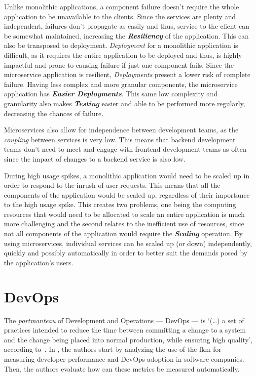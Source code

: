 Unlike monolithic applications, a component failure doesn't require the whole application to be unavailable to the clients. Since the services are plenty and independent, failures don't propagate as easily and thus, service to the client can be somewhat maintained, increasing the \textbf{\textit{Resiliency}} of the application. This can also be transposed to deployment. \textit{Deployment} for a monolithic application is difficult, as it requires the entire application to be deployed and thus, is highly impactful and prone to causing failure if just one component fails. Since the microservice application is resilient, \textit{Deployments} present a lower risk of complete failure. Having less complex and more granular components, the microservice application has \textbf{\textit{Easier Deployments}}. This same low complexity and granularity also makes \textbf{\textit{Testing}} easier and able to be performed more regularly, decreasing the chances of failure. 

Microservices also allow for independence between development teams, as the \textit{coupling} between services is very low. This means that backend development teams don't need to meet and engage with frontend development teams as often since the impact of changes to a backend service is also low.

During high usage spikes, a monolithic application would need to be scaled up in order to respond to the inrush of user requests. This means that all the components of the application would be scaled up, regardless of their importance to the high usage spike. This creates two problems, one being the computing resources that would need to be allocated to scale an entire application is much more challenging and the second relates to the inefficient use of resources, since not all components of the application would require the \textbf{\textit{Scaling}} operation. By using microservices, individual services can be scaled up (or down) independently, quickly and possibly automatically in order to better suit the demands posed by the application's users.


\section{DevOps}\label{state-of-the-art:s:devops}

The \textit{portmanteau} of Development and Operations --- DevOps --- is `(\ldots) a set of practices intended to reduce the time between committing a change to a system and the change being placed into normal production, while ensuring high quality', according to~\Parencite{bass_weber_zhu_2015}. 
In \parencite{sallin_kropp_anslow_quilty_meier_2021}, the authors start by analyzing the use of the \gls{fkm} \parencite{48455} for measuring developer performance and DevOps adoption in software companies. Then, the authors evaluate how can these metrics be measured automatically. 

